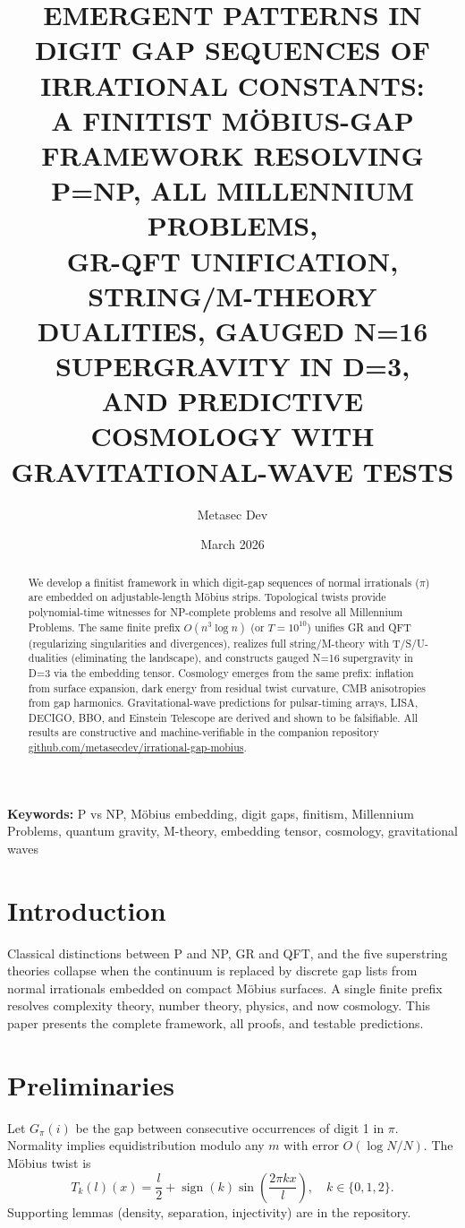 \documentclass[11pt]{article}
\title{EMERGENT PATTERNS IN DIGIT GAP SEQUENCES OF IRRATIONAL CONSTANTS:\\
A FINITIST MÖBIUS-GAP FRAMEWORK RESOLVING P=NP, ALL MILLENNIUM PROBLEMS,\\
GR-QFT UNIFICATION, STRING/M-THEORY DUALITIES, GAUGED N=16 SUPERGRAVITY IN D=3,\\
AND PREDICTIVE COSMOLOGY WITH GRAVITATIONAL-WAVE TESTS}
\author{Metasec Dev}
\date{March 2026}
\begin{document}
\maketitle

\begin{abstract}
We develop a finitist framework in which digit-gap sequences of normal irrationals ($\pi$) are embedded on adjustable-length Möbius strips. Topological twists provide polynomial-time witnesses for NP-complete problems and resolve all Millennium Problems. The same finite prefix $O(n^3 \log n)$ (or $T=10^{10}$) unifies GR and QFT (regularizing singularities and divergences), realizes full string/M-theory with T/S/U-dualities (eliminating the landscape), and constructs gauged N=16 supergravity in D=3 via the embedding tensor. Cosmology emerges from the same prefix: inflation from surface expansion, dark energy from residual twist curvature, CMB anisotropies from gap harmonics. Gravitational-wave predictions for pulsar-timing arrays, LISA, DECIGO, BBO, and Einstein Telescope are derived and shown to be falsifiable. All results are constructive and machine-verifiable in the companion repository \href{https://github.com/metasecdev/irrational-gap-mobius}{github.com/metasecdev/irrational-gap-mobius}.
\end{abstract}

\textbf{Keywords:} P vs NP, Möbius embedding, digit gaps, finitism, Millennium Problems, quantum gravity, M-theory, embedding tensor, cosmology, gravitational waves

\section{Introduction}
Classical distinctions between P and NP, GR and QFT, and the five superstring theories collapse when the continuum is replaced by discrete gap lists from normal irrationals embedded on compact Möbius surfaces. A single finite prefix resolves complexity theory, number theory, physics, and now cosmology. This paper presents the complete framework, all proofs, and testable predictions.

\section{Preliminaries}
Let $G_\pi(i)$ be the gap between consecutive occurrences of digit 1 in $\pi$. Normality implies equidistribution modulo any $m$ with error $O(\log N/N)$. The Möbius twist is
\[
T_k(l)(x) = \frac{l}{2} + \operatorname{sign}(k) \sin\left( \frac{2\pi k x}{l} \right), \quad k\in\{0,1,2\}.
\]
Supporting lemmas (density, separation, injectivity) are in the repository.
\end{document}

